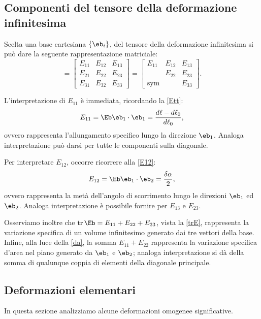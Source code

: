 \subsection{Componenti del tensore della deformazione infinitesima}
Scelta una base cartesiana $\{\eb_i\}$, del tensore della deformazione infinitesima si può dare la seguente rappresentazione matriciale:
\begin{equation}
	[\Eb]=\begin{bmatrix}E_{11}&E_{12}&E_{13}\\E_{21}&E_{22}&E_{23}\\E_{31}&E_{32}&E_{33}\end{bmatrix}=\begin{bmatrix}E_{11}&E_{12}&E_{13}\\&E_{22}&E_{23}\\\mathrm{sym}&&E_{33}\end{bmatrix}.
\end{equation}

L'interpretazione di $E_{11}$ è immediata, ricordando la \eqref{Ett}:
\begin{equation}
	E_{11}=\Eb\eb_1\cdot\eb_1=\frac{d\ell-d\ell_0}{d\ell_0},
\end{equation}
ovvero rappresenta l'allungamento specifico  lungo la direzione $\eb_1$. Analoga interpretazione può darsi per tutte le componenti sulla diagonale.

Per interpretare $E_{12}$, occorre ricorrere alla  \eqref{E12}: 
\begin{equation}
E_{12}=\Eb\eb_1\cdot\eb_2=\frac{\delta\alpha}{2},
\end{equation}
ovvero rappresenta la metà dell’angolo di scorrimento lungo le direzioni $\eb_1$ ed $\eb_2$. Analoga interpretazione è possibile fornire per $E_{13}$ e $E_{23}$. 

Osserviamo inoltre che $\operatorname{tr}\Eb=E_{11}+E_{22}+E_{33}$, vista la \eqref{trE}, rappresenta la variazione specifica di un volume infinitesimo generato dai tre vettori della base. Infine, alla luce della \eqref{da}, la somma $E_{11}+E_{22}$ rappresenta la variazione specifica d'area nel piano generato da $\eb_{1}$ e $\eb_2$; analoga interpretazione si dà della somma di qualunque coppia di elementi della diagonale principale.

\subsection{Deformazioni elementari}
In questa sezione analizziamo alcune deformazioni omogenee significative.


